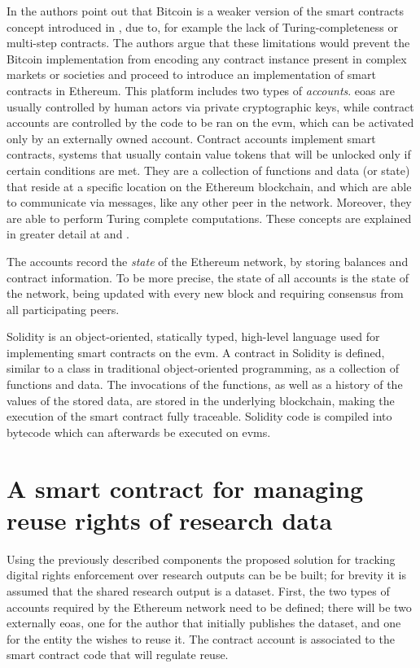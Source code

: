 In \cite{ethpap} the authors point out that Bitcoin is a weaker version of the smart contracts concept introduced in \cite{szabo}, due to, for example the lack of Turing-completeness or multi-step contracts. The authors argue that these limitations would prevent the Bitcoin implementation from encoding any contract instance present in complex markets or societies and proceed to introduce an implementation of smart contracts in Ethereum. This platform includes two types of \emph{accounts}. \glspl{eoa} are usually controlled by human actors via private cryptographic keys, while contract accounts are controlled by the code to be ran on the \gls{evm}, which can be activated only by an externally owned account. Contract accounts implement smart contracts, systems that usually contain value tokens that will be unlocked only if certain conditions are met. They are a collection of functions and data (or state) that reside at a specific location on the Ethereum blockchain, and which are able to communicate via messages, like any other peer in the network. Moreover, they are able to perform Turing complete computations. These concepts are explained in greater detail at \cite{ethpap} and \cite{ethdocs}.

The accounts record the \emph{state} of the Ethereum network, by storing balances and contract information. To be more precise, the state of all accounts is the state of the network, being updated with every new block and requiring consensus from all participating peers.

Solidity is an object-oriented, statically typed, high-level language used for implementing smart contracts on the \gls{evm}\cite{solidity}. A contract in Solidity is defined, similar to a class in traditional object-oriented programming, as a collection of functions and data. The invocations of the functions, as well as a history of the values of the stored data, are stored in the underlying blockchain, making the execution of the smart contract fully traceable. Solidity code is compiled into bytecode which can afterwards be executed on \glspl{evm}.

\section{A smart contract for managing reuse rights of research data}
\label{sec:smart}

Using the previously described components the proposed solution for tracking digital rights enforcement over research outputs can be be built; for brevity it is assumed that the shared research output is a dataset. First, the two types of accounts required by the Ethereum network need to be defined; there will be two externally \glspl{eoa}, one for the author that initially publishes the dataset, and one for the entity the wishes to reuse it. The contract account is associated to the smart contract code that will regulate reuse.

